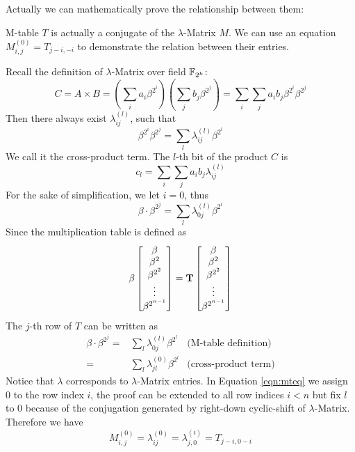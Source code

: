 Actually we can mathematically prove the relationship 
between them:
\begin{Theorem}
M-table $T$ is actually a conjugate of the $\lambda$-Matrix $M$. 
We can use an equation $M_{i,j}^{(0)} = T_{j-i,-i}$ to demonstrate the relation between their entries.
\end{Theorem}
\begin{Proof}
Recall the definition of $\lambda$-Matrix over field ${\mathbb{F}}_{2^k}$:
$$C = A\times B = \left(\sum_i a_i\beta^{2^i}\right)\left(\sum_jb_j\beta^{2^j}\right) = \sum_i\sum_ja_ib_j\beta^{2^i}\beta^{2^j}$$
Then there always exist $\lambda_{ij}^{(l)}$, such that 
$$\beta^{2^i}\beta^{2^j} = \sum_l\lambda_{ij}^{(l)}\beta^{2^l}$$
We call it the cross-product term. The $l$-th bit of the product $C$ is
$$c_l = \sum_i\sum_ja_ib_j\lambda_{ij}^{(l)}$$
For the sake of simplification, we let $i=0$, thus 
$$\beta\cdot\beta^{2^j} = \sum_l\lambda_{0j}^{(l)}\beta^{2^l}$$
Since the multiplication table is defined as
\begin{equation}
\beta
\begin{bmatrix}
\beta \\ \beta^2 \\ \beta^{2^2} \\ \vdots \\ \beta^{2^{n-1}}
\end{bmatrix}
= {\bf T}
\begin{bmatrix}
\beta \\ \beta^2 \\ \beta^{2^2} \\ \vdots \\ \beta^{2^{n-1}}
\end{bmatrix}
\end{equation}
The $j$-th row of $T$ can be written as
\begin{align}
\beta\cdot\beta^{2^j} =& \sum_l\lambda_{0j}^{(l)}\beta^{2^l} & \text{(M-table definition)} \nonumber\\
					=& \sum_l\lambda_{jl}^{(0)}\beta^{2^l} & \text{(cross-product term)} \label{eqn:mteq}
\end{align}
Notice that $\lambda$ corresponds to $\lambda$-Matrix entries. In Equation \ref{eqn:mteq} we assign $0$ to the 
row index $i$, the proof can be extended to all row indices $i<n$ but fix $l$ to 0 because of the 
conjugation generated by right-down cyclic-shift of $\lambda$-Matrix. Therefore we have 
$$M_{i,j}^{(0)} = \lambda_{ij}^{(0)} = \lambda_{j,0}^{(i)} = T_{j-i,0-i}$$
\end{Proof}

